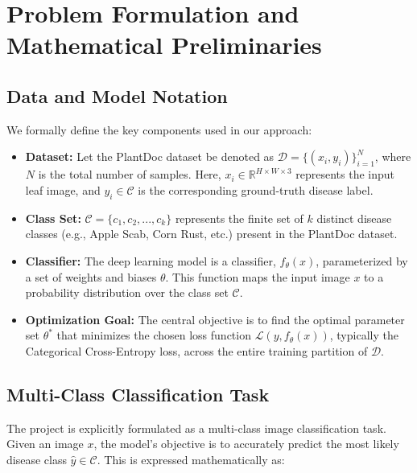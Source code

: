 \documentclass[12pt, a4paper]{report}
\begin{document}
\section{Problem Formulation and Mathematical Preliminaries}
\label{sec:preliminaries}

\subsection{Data and Model Notation}
\noindent %
We formally define the key components used in our approach:

\begin{itemize}
    \item \textbf{Dataset:} Let the PlantDoc dataset be denoted as $\mathcal{D} = \{(x_i, y_i)\}_{i=1}^{N}$, where $N$ is the total number of samples. Here, $x_i \in \mathbb{R}^{H \times W \times 3}$ represents the input leaf image, and $y_i \in \mathcal{C}$ is the corresponding ground-truth disease label.
    \item \textbf{Class Set:} $\mathcal{C} = \{c_1, c_2, ..., c_k\}$ represents the finite set of $k$ distinct disease classes (e.g., Apple Scab, Corn Rust, etc.) present in the PlantDoc dataset.
    \item \textbf{Classifier:} The deep learning model is a classifier, $f_{\theta}(x)$, parameterized by a set of weights and biases $\theta$. This function maps the input image $x$ to a probability distribution over the class set $\mathcal{C}$.
    \item \textbf{Optimization Goal:} The central objective is to find the optimal parameter set $\theta^*$ that minimizes the chosen loss function $\mathcal{L}(y, f_{\theta}(x))$, typically the Categorical Cross-Entropy loss, across the entire training partition of $\mathcal{D}$.
\end{itemize}

\subsection{Multi-Class Classification Task}
\noindent %
The project is explicitly formulated as a multi-class image classification task. Given an image $x$, the model's objective is to accurately predict the most likely disease class $\hat{y} \in \mathcal{C}$. This is expressed mathematically as:
\end{document}
